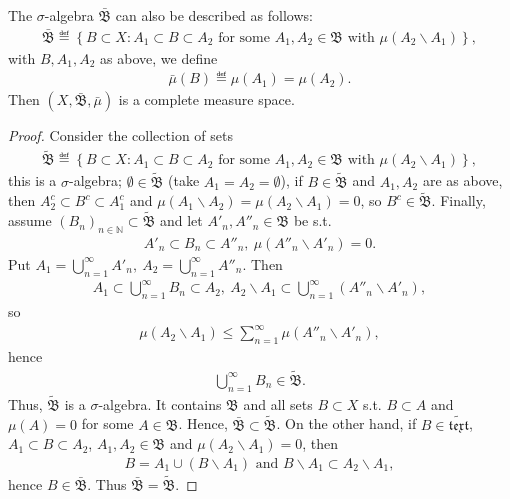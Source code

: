 \begin{prop}
    The \(\sigma\)-algebra \(\bar{\mathfrak{B}}\) can also be described as follows:
    \begin{align*}
        \bar{\mathfrak{B}} \eqdef \left\{ B\subset X : A_1\subset B \subset A_2 \text{ for some } A_1,A_2\in \mathfrak{B} \text{ with }
        \mu(A_2\backslash A_1)\right\},
    \end{align*}
    with \(B, A_1, A_2\) as above, we define 
    \begin{align*}
        \bar{\mu}(B) \eqdef \mu(A_1) = \mu(A_2).
    \end{align*}
    Then \((X,\bar{\mathfrak{B}},\bar{\mu})\) is a complete measure space.
\end{prop}
\begin{proof}
    Consider the collection of sets
    \begin{align*}
        \tilde{\mathfrak{B}} \eqdef \left\{ B\subset X : A_1\subset B \subset A_2 \text{ for some } A_1,A_2\in \mathfrak{B} \text{ with }
        \mu(A_2\backslash A_1)\right\},
    \end{align*}
    this is a \(\sigma\)-algebra; \(\emptyset \in \tilde{\mathfrak{B}}\) (take \(A_1=A_2=\emptyset\)), if \(B\in\tilde{\mathfrak{B}}\) and
    \(A_1,A_2\) are as above, then \(A_{2}^{c}\subset B^{c}\subset A_{1}^{c}\) and \(\mu(A_1\backslash A_2) = \mu(A_2\backslash A_1) = 0\), so 
    \(B^{c}\in\tilde{\mathfrak{B}}\). Finally, assume \(\left(  B_n\right)_{n\in\mathbb{N}} \subset \tilde{\mathfrak{B}}\) and let
    \(A'_{n}, A''_{n}\in\mathfrak{B}\) be s.t.
    \begin{align*}
        A'_n\subset B_n\subset A''_n, \ \mu(A''_n\backslash A'_n) = 0.
    \end{align*}
    Put \(A_1 = \bigcup\limits_{n=1}^{\infty}A'_n, \ A_2 = \bigcup\limits_{n=1}^{\infty}A''_n\). Then
    \begin{align*}
        A_1\subset \bigcup\limits_{n=1}^{\infty}B_n\subset A_2, \ A_2\backslash A_1 \subset \bigcup\limits_{n=1}^{\infty}\left( A''_n\backslash A'_n \right),
    \end{align*}
    so
    \begin{align*}
        \mu(A_2\backslash A_1) \leq \sum\limits_{n=1}^{\infty}\mu(A''_n\backslash A'_n),
    \end{align*}
    hence
    \begin{align*}
        \bigcup\limits_{n=1}^{\infty} B_n \in \tilde{\mathfrak{B}}.
    \end{align*}
    Thus, \(\tilde{\mathfrak{B}}\) is a \(\sigma\)-algebra. It contains \(\mathfrak{B}\) and all sets \(B\subset X\) s.t. \(B\subset A\)
    and \(\mu(A)=0\) for some \(A\in \mathfrak{B}\). Hence, \(\bar{\mathfrak{B}}\subset \tilde{\mathfrak{B}}\). On the other hand, if 
    \(B\in \tilde{\mathfrak{text}}\), \(A_1 \subset B\subset A_2\), \(A_1, A_2 \in \mathfrak{B}\) and \(\mu(A_2\backslash A_1) = 0\), then
    \begin{align*}
        B=A_1\cup \left(  B\backslash A_1\right) \text{ and } B\backslash A_1 \subset A_2\backslash A_1,
    \end{align*}
    hence \(B\in \bar{\mathfrak{B}}\). Thus \(\bar{\mathfrak{B}} = \tilde{\mathfrak{B}}\).


\end{proof}

